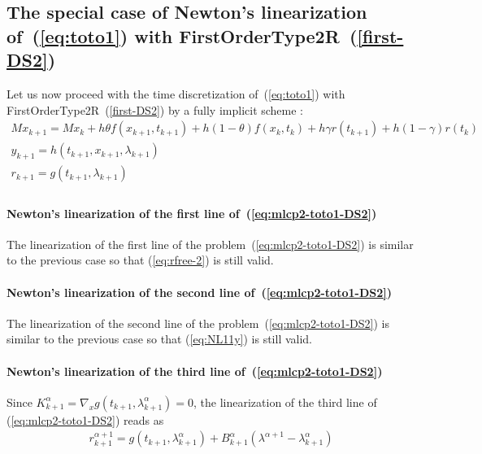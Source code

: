 

\subsection{The special case of Newton's linearization of~(\ref{eq:toto1}) with FirstOrderType2R~(\ref{first-DS2})}


Let us now proceed with the time discretization of~(\ref{eq:toto1}) with FirstOrderType2R~(\ref{first-DS2})  by a fully implicit scheme :
\begin{equation}
  \begin{array}{l}
    \label{eq:mlcp2-toto1-DS2}
     M x_{k+1} = M x_{k} +h\theta f(x_{k+1},t_{k+1})+h(1-\theta) f(x_k,t_k) + h \gamma r(t_{k+1})
     + h(1-\gamma)r(t_k)  \\[2mm]
     y_{k+1} =  h(t_{k+1},x_{k+1},\lambda _{k+1}) \\[2mm]
     r_{k+1} = g(t_{k+1},\lambda_{k+1})\\[2mm]
  \end{array}
\end{equation}


 \paragraph{Newton's linearization of the first line of~(\ref{eq:mlcp2-toto1-DS2})} The linearization of the first line of the  problem~(\ref{eq:mlcp2-toto1-DS2}) is similar to the previous case so that (\ref{eq:rfree-2}) is still valid.


 \paragraph{Newton's linearization of the second  line of~(\ref{eq:mlcp2-toto1-DS2})} The linearization of the second line of the  problem~(\ref{eq:mlcp2-toto1-DS2}) is similar to the previous case so that (\ref{eq:NL11y}) is still valid.

 \paragraph{Newton's linearization of the third  line of~(\ref{eq:mlcp2-toto1-DS2})}
Since $ K^{\alpha}_{k+1} = \nabla_xg(t_{k+1},\lambda ^{\alpha}_{k+1}) = 0 $, the linearization of the third line of (\ref{eq:mlcp2-toto1-DS2}) reads as
\begin{equation}
  \label{eq:mlcp2-rrL}
  \begin{array}{l}
    \boxed{r^{\alpha+1}_{k+1} = g(t_{k+1},\lambda ^{\alpha}_{k+1})     + B^{\alpha}_{k+1} ( \lambda^{\alpha+1}-  \lambda^{\alpha}_{k+1} )}
  \end{array}
\end{equation}


